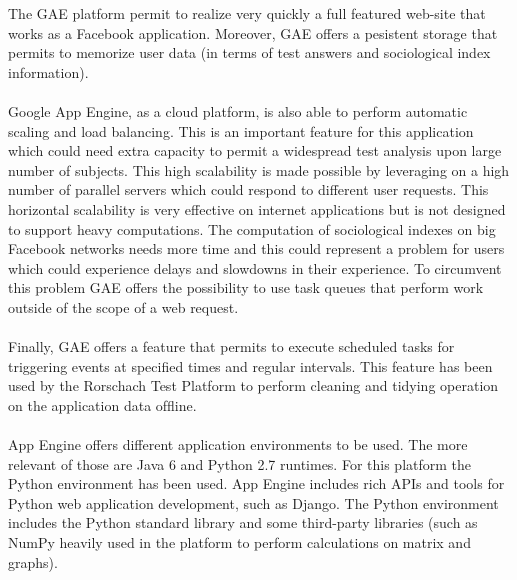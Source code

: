 The GAE platform permit to realize very quickly a full featured web-site that works as a Facebook application.
Moreover, GAE offers a pesistent storage that permits to memorize user data (in terms of test answers and sociological index information).\\
\\
Google App Engine, as a cloud platform, is also able to perform automatic scaling and load balancing.
This is an important feature for this application which could need extra capacity to permit a widespread test analysis upon large number of subjects.
This high scalability is made possible by leveraging on a high number of parallel servers which could respond to different user requests.
This horizontal scalability is very effective on internet applications but is not designed to support heavy computations.
The computation of sociological indexes on big Facebook networks needs more time and this could represent a problem for users which could experience delays and
slowdowns in their experience.
To circumvent this problem GAE offers the possibility to use task queues that perform work outside of the scope of a web request.\\
\\
Finally, GAE offers a feature that permits to execute scheduled tasks for triggering events at specified times and regular intervals.
This feature has been used by the Rorschach Test Platform to perform cleaning and tidying operation on the application data ofﬂine.\\
\\
App Engine offers different application environments to be used.
The more relevant of those are Java 6 and Python 2.7 runtimes.
For this platform the Python environment has been used.
App Engine includes rich APIs and tools for Python web application development, such as Django.
The Python environment includes the Python standard library and some third-party libraries (such as NumPy heavily used in the platform to perform calculations
on matrix and graphs).

\label{sec:fbintegration}

